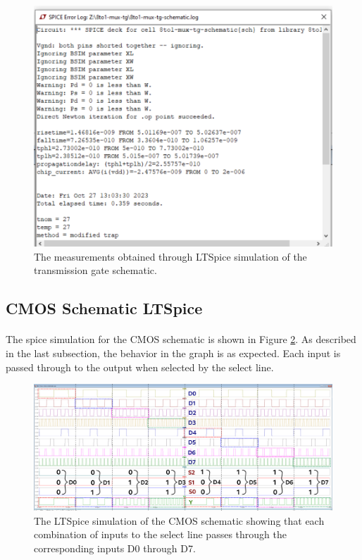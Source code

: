 \documentclass{article}
\begin{document}
    \begin{figure}[H]
      \centering
      \includegraphics[width=0.5\linewidth, frame]{screenshots/tg/schem/meas.png}
      \caption{The measurements obtained through LTSpice simulation of the transmission gate schematic.}
      \label{fig:tgschemmeas}
    \end{figure}



  \subsection{CMOS Schematic LTSpice}
    \paragraph{}
    The spice simulation for the CMOS schematic is shown in Figure \ref{fig:cmosspice}. As described in the last subsection, the behavior in the graph is as expected. Each input is passed through to the output when selected by the select line.


    \begin{figure}[H]
      \centering
      \includegraphics[width=\linewidth, frame]{screenshots/cmos/schem/spice.png}
      \caption{The LTSpice simulation of the CMOS schematic showing that each combination of inputs to the select line passes through the corresponding inputs D0 through D7.}
      \label{fig:cmosspice}
    \end{figure}
\end{document}

